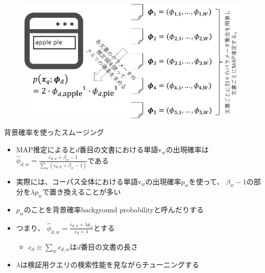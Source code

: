 \documentclass[aspectratio=169,unicode,dvipdfmx,14pt]{beamer}
\begin{document}
\begin{frame}
\begin{figure}[htbp]
\begin{center}
\includegraphics[scale=0.42]{IR_MAP.png}
\label{}
\end{center}
\end{figure}
\end{frame}

\begin{frame}{背景確率を使ったスムージング}
\begin{itemize}
\item MAP推定によると$d$番目の文書における単語$\mbox{v}_w$の出現確率は
$\hat{\phi}_{d,w} = \frac{c_{d,w} + \beta_w - 1}{\sum_w (c_{d,w} + \beta_w - 1)}$である
\item 実際には、コーパス全体における単語$\mbox{v}_w$の出現確率$p_w$を使って、
$\beta_w - 1$の部分を$\lambda p_w$で置き換えることが多い
\item $p_w$のことを背景確率background probabilityと呼んだりする
\item つまり、
$\hat{\phi}_{d,w} = \frac{c_{d,w} + \lambda p_w}{c_d + \lambda}$とする
\begin{itemize}
\item $c_d \equiv \sum_w c_{d,w}$は$d$番目の文書の長さ
\end{itemize}
\item $\lambda$は検証用クエリの検索性能を見ながらチューニングする
\end{itemize}
\end{frame}
\end{document}
